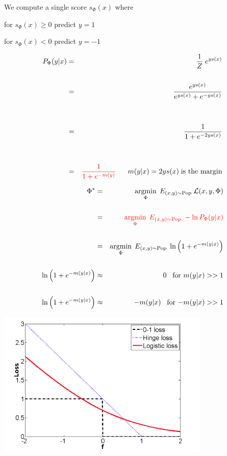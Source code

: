{\vfill
We compute a single score $s_\Phi(x)$ where

\vfill
for $s_\Phi(x) \geq 0$ predict $y = 1$

\vfill
for $s_\Phi(x) < 0$ predict $y = -1$


\begin{eqnarray*}
  P_\Phi(y|x) & = & \frac{1}{Z} \;e^{ys(x)} \\
  \\
  & = & \frac{e^{ys(x)}}{e^{ys(x)} + e^{-ys(x)}} \\
  \\
  \\
  & = & \frac{1}{1 + e^{-2ys(x)}} \\
  \\
  \\
    & = & {\color{red} \frac{1}{1 + e^{-m(y)}}} \;\;\;\;\;\;m(y|x) = 2ys(x)\;\mbox{is the margin}
\end{eqnarray*}


\begin{eqnarray*}
  \Phi^* & = & \operatorname*{argmin}_\Phi\;E_{(x,y) \sim \mathrm{Pop}}\;{\cal L}(x,y,\Phi) \\
  \\
  & = & {\color{red} \operatorname*{argmin}_\Phi\;E_{(x,y) \sim \mathrm{Pop}}\;-\ln P_\Phi(y|x)} \\
  \\
  & = & \operatorname*{argmin}_\Phi\;E_{(x,y) \sim \mathrm{Pop}}\;\ln \left(1 + e^{-m(y|x)}\right) \\
  \\
  \ln \left(1 + e^{-m(y|x)}\right) & \approx & 0 \;\;\;\mbox{for $m(y|x) >> 1$} \\
  \\
  \ln \left(1 + e^{-m(y|x)}\right) & \approx & -m(y|x) \;\;\;\mbox{for $-m(y|x) >> 1$} \\
\end{eqnarray*}


\centerline{\includegraphics[width = 4.0in]{../images/logloss}}

}
